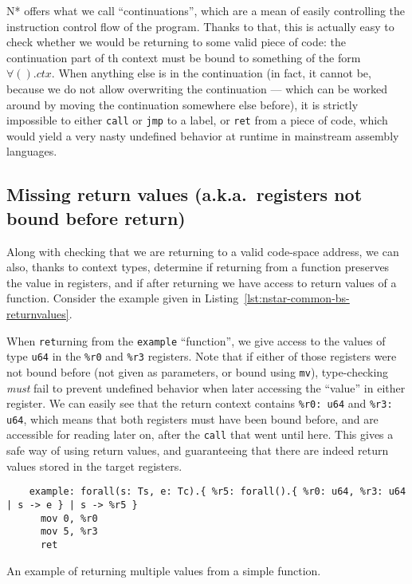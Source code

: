 N* offers what we call ``continuations'', which are a mean of easily controlling the instruction control flow of the program.
Thanks to that, this is actually easy to check whether we would be returning to some valid piece of code: the continuation part of th context must be bound to something of the form $\forall().ctx$.
When anything else is in the continuation (in fact, it cannot be, because we do not allow overwriting the continuation --- which can be worked around by moving the continuation somewhere else before), it is strictly impossible to either \texttt{call} or \texttt{jmp} to a label, or \texttt{ret} from a piece of code, which would yield a very nasty undefined behavior at runtime in mainstream assembly languages.

\subsection{Missing return values (a.k.a.\ registers not bound before return)}\label{subsec:nstar-common-bs-restrictions-unboundregs}

Along with checking that we are returning to a valid code-space address, we can also, thanks to context types, determine if returning from a function preserves the value in registers, and if after returning we have access to return values of a function.
Consider the example given in Listing~\ref{lst:nstar-common-bs-returnvalues}.

When \texttt{ret}urning from the \texttt{example} ``function'', we give access to the values of type \texttt{u64} in the \texttt{\%r0} and \texttt{\%r3} registers.
Note that if either of those registers were not bound before (not given as parameters, or bound using \texttt{mv}), type-checking \textit{must} fail to prevent undefined behavior when later accessing the ``value'' in either register.
We can easily see that the return context contains \texttt{\%r0: u64} and \texttt{\%r3: u64}, which means that both registers must have been bound before, and are accessible for reading later on, after the \texttt{call} that went until here.
This gives a safe way of using return values, and guaranteeing that there are indeed return values stored in the target registers.

\begin{listing}[htb]
  \centering
  \begin{minipage}{0.90\textwidth}
    \begin{verbatim}
    example: forall(s: Ts, e: Tc).{ %r5: forall().{ %r0: u64, %r3: u64 | s -> e } | s -> %r5 }
      mov 0, %r0
      mov 5, %r3
      ret
    \end{verbatim}
  \end{minipage}
  \caption{An example of returning multiple values from a simple function.}
  \label{lst:nstar-common-bs-returnvalues}
\end{listing}

